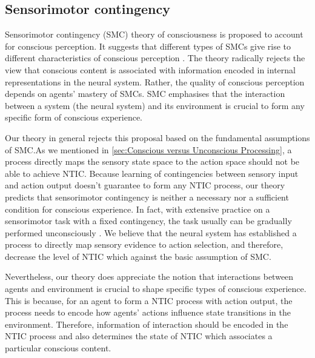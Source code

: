 \documentclass[utf8]{article}
\begin{document}
		\subsection{Sensorimotor contingency}
		Sensorimotor contingency (SMC) theory of consciousness is proposed to account for conscious perception. It suggests that different types of SMCs give rise to different characteristics of conscious perception \cite{o2001sensorimotor}. The theory radically rejects the view that conscious content is associated with information encoded in internal representations in the neural system. Rather, the quality of conscious perception depends on agents' mastery of SMCs. SMC emphasises that the interaction between a system (the neural system) and its environment is crucial to form any specific form of conscious experience. 
	
	    Our theory in general rejects this proposal based on the fundamental assumptions of SMC.As we mentioned in \ref{sec:Conscious versus Unconscious Processing}, a process directly maps the sensory state space to the action space should not be able to achieve NTIC. Because learning of contingencies between sensory input and action output doesn't guarantee to form any NTIC process, our theory predicts that sensorimotor contingency is neither a necessary nor a sufficient condition for conscious experience. In fact, with extensive practice on a sensorimotor task with a fixed contingency, the task usually can be gradually performed unconsciously \needref{}. We believe that the neural system has established a process to directly map sensory evidence to action selection, and therefore, decrease the level of NTIC which against the basic assumption of SMC.
	    
	    Nevertheless, our theory does appreciate the notion that interactions between agents and environment is crucial to shape specific types of conscious experience. This is because, for an agent to form a NTIC process with action output, the process needs to encode how agents' actions influence state transitions in the environment. Therefore, information of interaction should be encoded in the NTIC process and also determines the state of NTIC which associates a particular conscious content. 
	    
\end{document}
